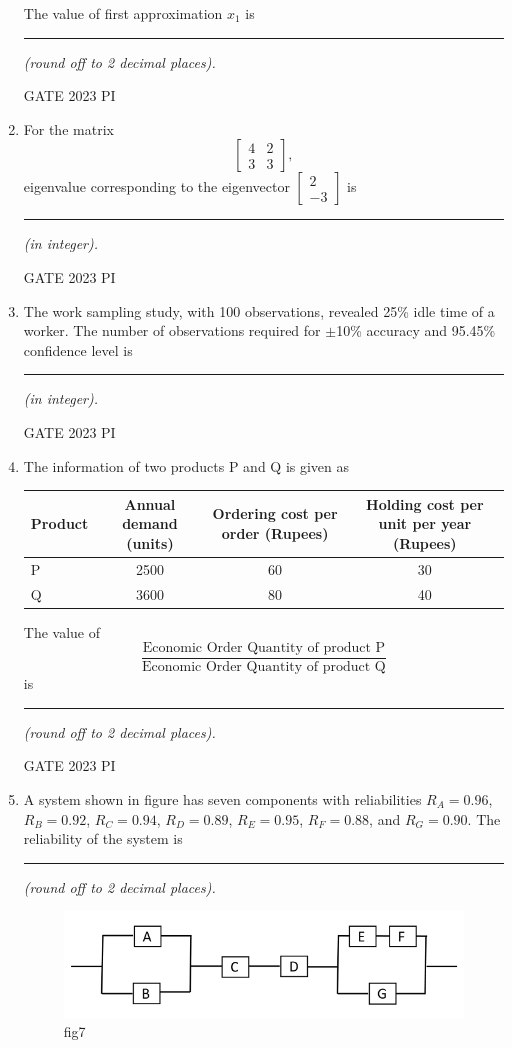 \documentclass[journal,12pt,onecolumn]{IEEEtran}
\theoremstyle{remark}
\begin{document}
\begin{enumerate}
The value of first approximation \( x_1 \) is \rule{3cm}{0.15mm} \textit{(round off to 2 decimal places).}

\hfill{GATE 2023 PI}

\item For the matrix 
\[
\begin{bmatrix}
4 & 2 \\
3 & 3
\end{bmatrix},
\]
eigenvalue corresponding to the eigenvector 
\(
\begin{bmatrix}
2 \\
-3
\end{bmatrix}
\)
is \rule{3cm}{0.15mm} \textit{(in integer).}

\hfill{GATE 2023 PI}

\item The work sampling study, with 100 observations, revealed 25\% idle time of a worker. The number of observations required for $\pm$10\% accuracy and 95.45\% confidence level is \rule{3cm}{0.15mm} \textit{(in integer).}

\hfill{GATE 2023 PI}
\item The information of two products P and Q is given as

\begin{center}
\begin{tabular}{|l|c|c|c|}
\hline
\textbf{Product} & \textbf{Annual demand (units)} & \textbf{Ordering cost per order (Rupees)} & \textbf{Holding cost per unit per year (Rupees)} \\
\hline
P & 2500 & 60 & 30 \\
Q & 3600 & 80 & 40 \\
\hline
\end{tabular}
\end{center}

The value of  
\[
\frac{\text{Economic Order Quantity of product P}}{\text{Economic Order Quantity of product Q}}
\]
is \rule{3cm}{0.15mm} \textit{(round off to 2 decimal places).}

\hfill{GATE 2023 PI}


\item A system shown in figure has seven components with reliabilities $R_A = 0.96$, $R_B = 0.92$, $R_C = 0.94$, $R_D = 0.89$, $R_E = 0.95$, $R_F = 0.88$, and $R_G = 0.90$. The reliability of the system is \rule{3cm}{0.15mm} \textit{(round off to 2 decimal places).}
\begin{figure}[H]
    \centering
    \includegraphics[width=0.5\linewidth]{figs/Q.54.png}
    \caption{fig7}
    \label{fig:figs/Q.54.png}
\end{figure}


\end{enumerate}
\end{document}
